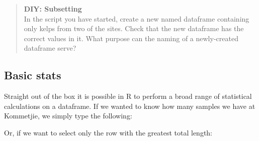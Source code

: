 \documentclass[]{book}
\newenvironment{Shaded}{\begin{snugshade}}{\end{snugshade}}
\newcommand{\KeywordTok}[1]{\textcolor[rgb]{0.13,0.29,0.53}{\textbf{#1}}}
\newcommand{\StringTok}[1]{\textcolor[rgb]{0.31,0.60,0.02}{#1}}
\newcommand{\CommentTok}[1]{\textcolor[rgb]{0.56,0.35,0.01}{\textit{#1}}}
\newcommand{\OperatorTok}[1]{\textcolor[rgb]{0.81,0.36,0.00}{\textbf{#1}}}
\newcommand{\NormalTok}[1]{#1}
\theoremstyle{definition}
\theoremstyle{definition}
\theoremstyle{definition}
\theoremstyle{remark}
\begin{document}
\begin{Shaded}
\end{Shaded}

\begin{quote}
\textbf{DIY: Subsetting}\\
In the script you have started, create a new named dataframe containing
only kelps from two of the sites. Check that the new dataframe has the
correct values in it. What purpose can the naming of a newly-created
dataframe serve?
\end{quote}

\subsection{Basic stats}\label{basic-stats}

Straight out of the box it is possible in R to perform a broad range of
statistical calculations on a dataframe. If we wanted to know how many
samples we have at Kommetjie, we simply type the following:

\begin{Shaded}
\end{Shaded}

Or, if we want to select only the row with the greatest total length:

\begin{Shaded}
\end{Shaded}
\end{document}
